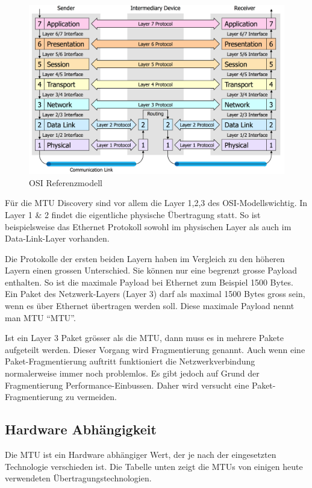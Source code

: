 \begin{figure}[H]
    \begin{center}
        \includegraphics[trim=1 0 0 0,clip,width=\textwidth]{mainpart/analyse/img/OSI_Modell}
    \end{center}
    \caption{\ac{OSI} Referenzmodell}
\end{figure}

Für die \ac{MTU} Discovery sind vor allem die Layer 1,2,3 des \ac{OSI}-Modells\footnotemark[1] wichtig. In Layer 1 \& 2 findet die eigentliche physische Übertragung statt. So ist beispielsweise das Ethernet Protokoll sowohl im physischen Layer als auch im Data-Link-Layer vorhanden.

Die Protokolle der ersten beiden Layern haben im Vergleich zu den höheren Layern einen grossen Unterschied. Sie können nur eine begrenzt grosse Payload enthalten. So ist die maximale Payload bei Ethernet zum Beispiel 1500 Bytes. Ein Paket des Netzwerk-Layers (Layer 3) darf als maximal 1500 Bytes gross sein, wenn es über Ethernet übertragen werden soll. Diese maximale Payload nennt man \acl{MTU} \enquote{\acs{MTU}}.


Ist ein Layer 3 Paket grösser als die \ac{MTU}, dann muss es in mehrere Pakete aufgeteilt werden. Dieser Vorgang wird Fragmentierung genannt. Auch wenn eine Paket-Fragmentierung auftritt funktioniert die Netzwerkverbindung normalerweise immer noch problemlos. Es gibt jedoch auf Grund der Fragmentierung Performance-Einbussen. Daher wird versucht eine Paket-Fragmentierung zu vermeiden.

\subsection{Hardware Abhängigkeit}
Die \ac{MTU} ist ein Hardware abhängiger Wert, der je nach der eingesetzten Technologie verschieden ist. Die Tabelle unten zeigt die \ac{MTU}s von einigen heute verwendeten Übertragungstechnologien.

